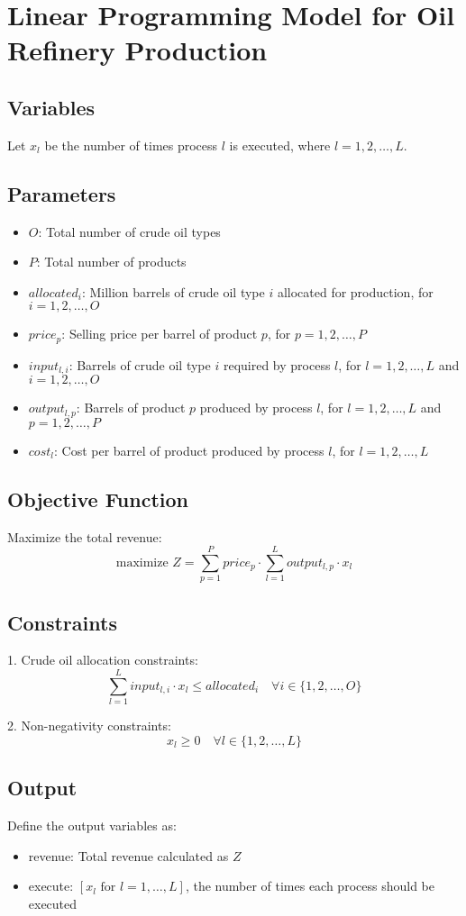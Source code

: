 \documentclass{article}
\begin{document}
\section*{Linear Programming Model for Oil Refinery Production}

\subsection*{Variables}
Let $x_l$ be the number of times process $l$ is executed, where $l = 1, 2, \ldots, L$.

\subsection*{Parameters}
\begin{itemize}
    \item $O$: Total number of crude oil types
    \item $P$: Total number of products
    \item $allocated_i$: Million barrels of crude oil type $i$ allocated for production, for $i = 1, 2, \ldots, O$
    \item $price_p$: Selling price per barrel of product $p$, for $p = 1, 2, \ldots, P$
    \item $input_{l,i}$: Barrels of crude oil type $i$ required by process $l$, for $l = 1, 2, \ldots, L$ and $i = 1, 2, \ldots, O$
    \item $output_{l,p}$: Barrels of product $p$ produced by process $l$, for $l = 1, 2, \ldots, L$ and $p = 1, 2, \ldots, P$
    \item $cost_l$: Cost per barrel of product produced by process $l$, for $l = 1, 2, \ldots, L$
\end{itemize}

\subsection*{Objective Function}
Maximize the total revenue:
\[
\text{maximize } Z = \sum_{p=1}^{P} price_p \cdot \sum_{l=1}^{L} output_{l,p} \cdot x_l
\]

\subsection*{Constraints}
1. Crude oil allocation constraints:
\[
\sum_{l=1}^{L} input_{l,i} \cdot x_l \leq allocated_i \quad \forall i \in \{1, 2, \ldots, O\}
\]

2. Non-negativity constraints:
\[
x_l \geq 0 \quad \forall l \in \{1, 2, \ldots, L\}
\]

\subsection*{Output}
Define the output variables as:
\begin{itemize}
    \item revenue: Total revenue calculated as $Z$
    \item execute: $[x_l \text{ for } l=1, \dots, L]$, the number of times each process should be executed
\end{itemize}
\end{document}
